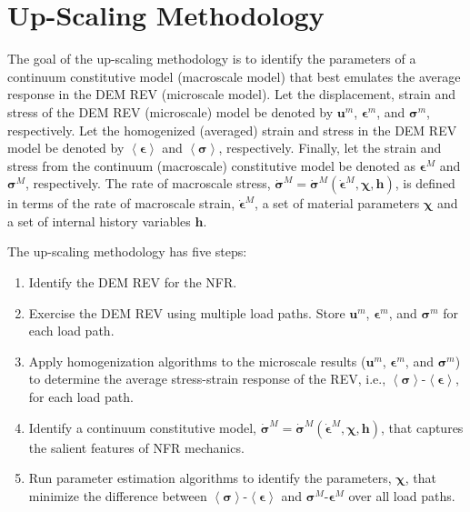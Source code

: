 \chapter{Up-Scaling Methodology}
The goal of the up-scaling methodology is to identify the parameters of a continuum constitutive model (macroscale model) that best emulates the average response in the DEM REV (microscale model). Let the displacement, strain and stress of the DEM REV (microscale) model be denoted by $\mathbf{u}^m$, $\boldsymbol{\epsilon}^m$, and $\boldsymbol{\sigma}^m$, respectively. Let the homogenized (averaged) strain and stress in the DEM REV model be denoted by  $\left<\boldsymbol{\epsilon}\right>$ and $\left<\boldsymbol{\sigma}\right>$, respectively.  Finally, let the strain and stress from the continuum (macroscale) constitutive model be denoted as $\boldsymbol{\epsilon}^M$ and $\boldsymbol{\sigma}^M$, respectively. The rate of macroscale stress, $\dot{\boldsymbol{\sigma}}^M=\dot{\boldsymbol{\sigma}}^M\left(\dot{\boldsymbol{\epsilon}}^M, \boldsymbol{\chi},\mathbf{h}\right)$, is defined in terms of the rate of macroscale strain, $\dot{\boldsymbol{\epsilon}}^M$, a set of material parameters $\boldsymbol{\chi}$ and a set of internal history variables $\mathbf{h}$.

The up-scaling methodology has five steps: 
\begin{enumerate}
    \item Identify the DEM REV for the NFR.
	\item Exercise the DEM REV using multiple load paths. Store $\mathbf{u}^m$, $\boldsymbol{\epsilon}^m$, and $\boldsymbol{\sigma}^m$ for each load path.
	\item Apply homogenization algorithms to the microscale results ($\mathbf{u}^m$, $\boldsymbol{\epsilon}^m$, and $\boldsymbol{\sigma}^m$) to determine the average stress-strain response of the REV, i.e., $\left<\boldsymbol{\sigma}\right>$-$\left<\boldsymbol{\epsilon}\right>$, for each load path.
	\item Identify a continuum constitutive model, $\dot{\boldsymbol{\sigma}}^M=\dot{\boldsymbol{\sigma}}^M\left(\dot{\boldsymbol{\epsilon}}^M, \boldsymbol{\chi},\mathbf{h}\right)$, that captures the salient features of NFR mechanics.
	\item Run parameter estimation algorithms to identify the parameters, $\boldsymbol{\chi}$, that minimize the difference between $\left<\boldsymbol{\sigma}\right>$-$\left<\boldsymbol{\epsilon}\right>$ and $\boldsymbol{\sigma}^M$-$\boldsymbol{\epsilon}^M$ over all load paths.
\end{enumerate}

